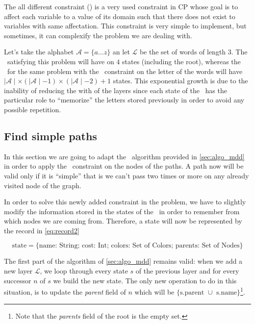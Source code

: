 The all different constraint (\alldiff) is a very used constraint in CP whose goal is to affect each variable to a value of its domain such that there does not exist to variables with same affectation. This constraint is very simple to implement, but sometimes, it can complexify the problem we are dealing with.

Let's take the alphabet $\mathcal{A} = \{a \dots z\}$ an let $\mathcal{L}$ be the set of words of length $3$. The \mdd\ satisfying this problem will have on $4$ states (including the root), whereas the \mdd\ for the same problem with the \alldiff\ constraint on the letter of the words will have $\mid \mathcal{A} \mid \times (\mid \mathcal{A} \mid - 1) \times (\mid \mathcal{A} \mid - 2) + 1$ states. This exponential growth is due to the inability of reducing the with of the layers since each state of the \mdd\ has the particular role to ``memorize'' the letters stored previously in order to avoid any possible repetition.

\subsection{Find simple paths}

In this section we are going to adapt the \mdd\ algorithm provided in \cref{sec:algo_mdd} in order to apply the \alldiff\ constraint on the nodes of the paths. A path now will be valid only if it is ``simple'' that is we can't pass two times or more on any already visited node of the graph.

In order to solve this newly added constraint in the problem, we have to slightly modify the information stored in the states of the \mdd\ in order to remember from which nodes we are coming from. Therefore, a state will now be represented by the record in \cref{eq:record2}

\begin{equation}
  \label{eq:record2}
  \text{state} = \{\text{name: String; cost: Int; colors: Set of Colors; parents: Set of Nodes}\}
\end{equation}

The first part of the algorithm of \cref{sec:algo_mdd} remains valid: when we add a new layer $\mathcal{L}$, we loop through every state $s$ of the previous layer and for every successor $n$ of $s$ we build the new state. The only new operation to do in this situation, is to update the \textit{parent} field of $n$ which will be $\{\text{s.parent } \cup \text{ s.name}\}$\footnote{Note that the \textit{parents} field of the root is the empty set.}.

